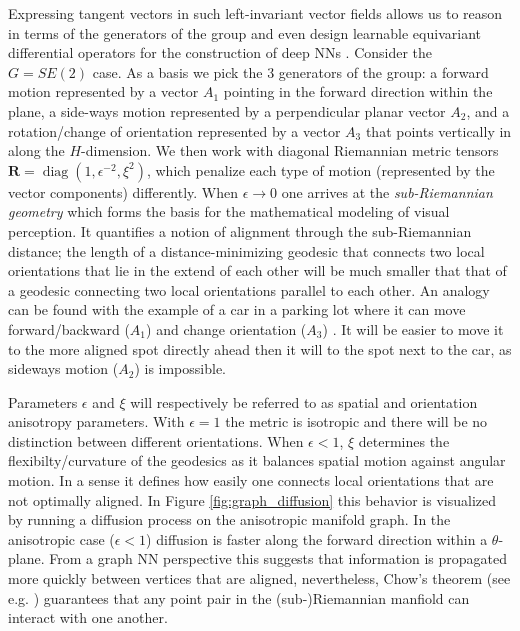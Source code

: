 \documentclass{article}
\DeclareMathOperator{\diag}{diag}
\begin{document}
Expressing tangent vectors in such left-invariant vector fields allows us to reason in terms of the generators of the group and even design learnable equivariant differential operators for the construction of deep NNs \citep{smets2020pde}. Consider the $G=SE(2)$ case. As a basis we pick the 3 generators of the group: a forward motion represented by a vector $A_1$ pointing in the forward direction within the plane, a side-ways motion represented by a perpendicular planar vector $A_2$, and a rotation/change of orientation represented by a vector $A_3$ that points vertically in along the $H$-dimension. We then work with diagonal Riemannian metric tensors $\mathbf{R} = \diag (1, \epsilon^{-2}, \xi^{2})$, which penalize each type of motion (represented by the vector components) differently. When $\epsilon \rightarrow 0$ one arrives at the \textit{sub-Riemannian geometry} which forms the basis for the mathematical modeling of visual perception. It quantifies a notion of alignment through the sub-Riemannian distance; the length of a distance-minimizing geodesic that connects two local orientations that lie in the extend of each other will be much smaller that that of a geodesic connecting two local orientations parallel to each other. An analogy can be found with the example of a car in a parking lot where it can move forward/backward ($A_1$) and change orientation ($A_3$) \citep{reeds1990optimal}. It will be easier to move it to the more aligned spot directly ahead then it will to the spot next to the car, as sideways motion ($A_2$) is impossible.  

Parameters $\epsilon$ and $\xi$ will respectively be referred to as spatial and orientation anisotropy parameters. With $\epsilon=1$ the metric is isotropic and there will be no distinction between different orientations. When $\epsilon < 1$, $\xi$ determines the flexibilty/curvature of the geodesics as it balances spatial motion against angular motion. In a sense it defines how easily one connects local orientations that are not optimally aligned. In Figure \ref{fig:graph_diffusion} this behavior is visualized by running a diffusion process on the anisotropic manifold graph. In the anisotropic case ($\epsilon<1$) diffusion is faster along the forward direction within a $\theta$-plane. From a graph NN perspective this suggests that information is propagated more quickly between vertices that are aligned, nevertheless, Chow's theorem (see e.g. \citep{mont}) guarantees that any point pair in the (sub-)Riemannian manfiold can interact with one another.
\end{document}
